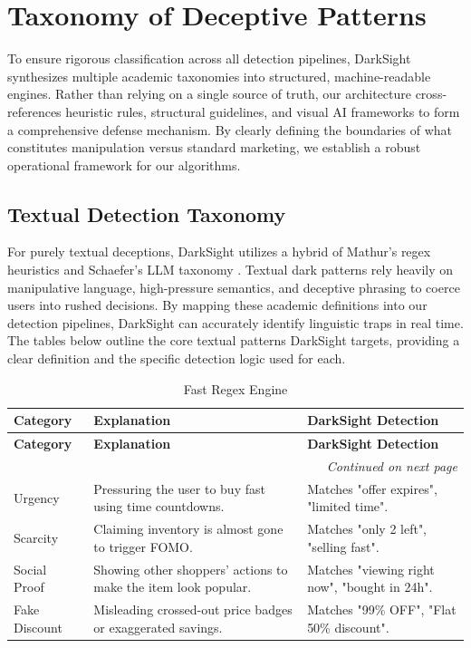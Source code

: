\documentclass[12pt,a4paper]{article}
\begin{document}
\section{Taxonomy of Deceptive Patterns}
To ensure rigorous classification across all detection pipelines, DarkSight synthesizes multiple academic taxonomies into structured, machine-readable engines. Rather than relying on a single source of truth, our architecture cross-references heuristic rules, structural guidelines, and visual AI frameworks to form a comprehensive defense mechanism. By clearly defining the boundaries of what constitutes manipulation versus standard marketing, we establish a robust operational framework for our algorithms.

\subsection{Textual Detection Taxonomy}
For purely textual deceptions, DarkSight utilizes a hybrid of Mathur's regex heuristics \cite{mathur2019} and Schaefer's LLM taxonomy \cite{schaefer2023}. Textual dark patterns rely heavily on manipulative language, high-pressure semantics, and deceptive phrasing to coerce users into rushed decisions. By mapping these academic definitions into our detection pipelines, DarkSight can accurately identify linguistic traps in real time. The tables below outline the core textual patterns DarkSight targets, providing a clear definition and the specific detection logic used for each.

\begin{longtable}{|p{}|p{}|p{}|}
\caption{Fast Regex Engine \cite{mathur2019}} \label{tab:regex_tax} \\
\hline
\textbf{Category} & \textbf{Explanation} & \textbf{DarkSight Detection} \\ \hline
\endfirsthead
\hline
\textbf{Category} & \textbf{Explanation} & \textbf{DarkSight Detection} \\ \hline
\endhead
\hline
\multicolumn{3}{|r|}{\textit{Continued on next page}} \\
\hline
\endfoot
\hline
\endlastfoot
Urgency & Pressuring the user to buy fast using time countdowns. & Matches "offer expires", "limited time". \\ \hline
Scarcity & Claiming inventory is almost gone to trigger FOMO. & Matches "only 2 left", "selling fast". \\ \hline
Social Proof & Showing other shoppers' actions to make the item look popular. & Matches "viewing right now", "bought in 24h". \\ \hline
Fake Discount & Misleading crossed-out price badges or exaggerated savings. & Matches "99\% OFF", "Flat 50\% discount". \\ \hline
\end{longtable}
\end{document}
